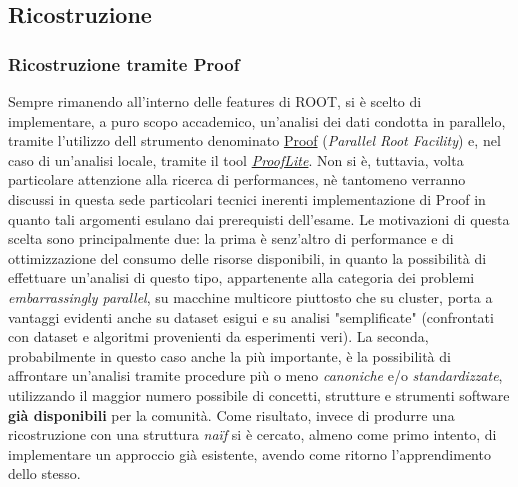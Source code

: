 \documentclass{article}
\begin{document}
\subsection{Ricostruzione}
\subsubsection{Ricostruzione tramite Proof}
Sempre rimanendo all'interno delle features di ROOT, si è scelto di implementare, a puro scopo accademico, un'analisi dei dati condotta in parallelo, tramite l'utilizzo dell strumento denominato \href{http://root.cern.ch/drupal/content/proof}{Proof} (\textit{Parallel Root Facility}) e, nel caso di un'analisi locale, tramite il tool \textit{\href{http://root.cern.ch/drupal/content/proof-multicore-desktop-laptop-proof-lite}{ProofLite}}. 
Non si è, tuttavia, volta particolare attenzione alla ricerca di performances, nè tantomeno verranno discussi in questa sede particolari tecnici inerenti implementazione di Proof in quanto tali argomenti esulano dai prerequisti dell'esame.\newline
Le motivazioni di questa scelta sono principalmente due: la prima è senz'altro di performance e di ottimizzazione del consumo delle risorse disponibili, in quanto la possibilità di effettuare un'analisi di questo tipo, appartenente alla categoria dei problemi \textit{embarrassingly parallel}, su macchine multicore piuttosto che su cluster, porta a vantaggi evidenti anche su dataset esigui e su analisi "semplificate" (confrontati con dataset e algoritmi provenienti da esperimenti veri).  
La seconda, probabilmente in questo caso anche la più importante, è la possibilità di affrontare un'analisi tramite procedure più o meno \textit{canoniche} e/o \textit{standardizzate}, utilizzando il maggior numero possibile di concetti, strutture e strumenti software \textbf{già disponibili} per la comunità. Come risultato, invece di produrre una ricostruzione con una struttura \textit{naïf} si è cercato, almeno come primo intento, di implementare un approccio già esistente, avendo come ritorno l'apprendimento dello stesso.
\end{document}
